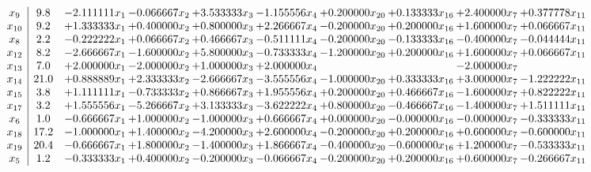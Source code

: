 \documentclass[10pt]{article}
\begin{document}
 \[\begin{array}{c| c c@{\hskip 2pt} c@{\hskip 2pt} c@{\hskip 2pt} c@{\hskip 2pt} c@{\hskip 2pt} c@{\hskip 2pt} c@{\hskip 2pt} c@{\hskip 2pt} }
 x_{9}   &  9.8 & -2.111111 x_{1} & -0.066667 x_{2} & + 3.533333 x_{3} & -1.155556 x_{4} & + 0.200000 x_{20} & + 0.133333 x_{16} & + 2.400000 x_{7} & + 0.377778 x_{11}\\
 x_{10}   &  9.2 & + 1.333333 x_{1} & + 0.400000 x_{2} & + 0.800000 x_{3} & + 2.266667 x_{4} & -0.200000 x_{20} & + 0.200000 x_{16} & + 1.600000 x_{7} & + 0.066667 x_{11}\\
 x_{8}   &  2.2 & -0.222222 x_{1} & + 0.066667 x_{2} & + 0.466667 x_{3} & -0.511111 x_{4} & -0.200000 x_{20} & -0.133333 x_{16} & -0.400000 x_{7} & -0.044444 x_{11}\\
 x_{12}   &  8.2 & -2.666667 x_{1} & -1.600000 x_{2} & + 5.800000 x_{3} & -0.733333 x_{4} & -1.200000 x_{20} & + 0.200000 x_{16} & + 1.600000 x_{7} & + 0.066667 x_{11}\\
 x_{13}   &  7.0 & + 2.000000 x_{1} & -2.000000 x_{2} & + 1.000000 x_{3} & + 2.000000 x_{4} &    &   & -2.000000 x_{7} &   \\
 x_{14}   &  21.0 & + 0.888889 x_{1} & + 2.333333 x_{2} & -2.666667 x_{3} & -3.555556 x_{4} & -1.000000 x_{20} & + 0.333333 x_{16} & + 3.000000 x_{7} & -1.222222 x_{11}\\
 x_{15}   &  3.8 & + 1.111111 x_{1} & -0.733333 x_{2} & + 0.866667 x_{3} & + 1.955556 x_{4} & + 0.200000 x_{20} & + 0.466667 x_{16} & -1.600000 x_{7} & + 0.822222 x_{11}\\
 x_{17}   &  3.2 & + 1.555556 x_{1} & -5.266667 x_{2} & + 3.133333 x_{3} & -3.622222 x_{4} & + 0.800000 x_{20} & -0.466667 x_{16} & -1.400000 x_{7} & + 1.511111 x_{11}\\
 x_{6}   &  1.0 & -0.666667 x_{1} & + 1.000000 x_{2} & -1.000000 x_{3} & + 0.666667 x_{4} & + 0.000000 x_{20} & -0.000000 x_{16} & -0.000000 x_{7} & -0.333333 x_{11}\\
 x_{18}   &  17.2 & -1.000000 x_{1} & + 1.400000 x_{2} & -4.200000 x_{3} & + 2.600000 x_{4} & -0.200000 x_{20} & + 0.200000 x_{16} & + 0.600000 x_{7} & -0.600000 x_{11}\\
 x_{19}   &  20.4 & -0.666667 x_{1} & + 1.800000 x_{2} & -1.400000 x_{3} & + 1.866667 x_{4} & -0.400000 x_{20} & -0.600000 x_{16} & + 1.200000 x_{7} & -0.533333 x_{11}\\
 x_{5}   &  1.2 & -0.333333 x_{1} & + 0.400000 x_{2} & -0.200000 x_{3} & -0.066667 x_{4} & -0.200000 x_{20} & + 0.200000 x_{16} & + 0.600000 x_{7} & -0.266667 x_{11}\\

\end{array}\]
\end{document}
